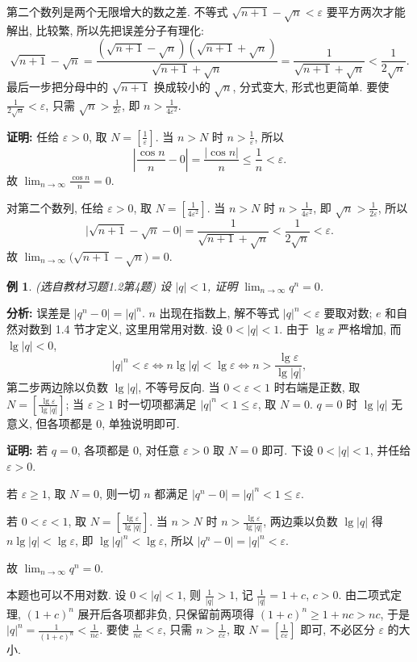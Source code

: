 \documentclass[UTF8,openany]{ctexbook}
\theoremstyle{chinesetextbook}
\newtheorem{example}{例}[section]
\newenvironment{cnproof}{\par\indent\textbf{证明:} \ignorespaces}{\par}
\begin{document}
第二个数列是两个无限增大的数之差. 不等式 $\sqrt{n+1}-\sqrt n<\varepsilon$ 要平方两次才能解出, 比较繁, 所以先把误差分子有理化:
\[
\sqrt{n+1}-\sqrt n=\frac{(\sqrt{n+1}-\sqrt n)(\sqrt{n+1}+\sqrt n)}{\sqrt{n+1}+\sqrt n}=\frac1{\sqrt{n+1}+\sqrt n}<\frac1{2\sqrt n}.
\]
最后一步把分母中的 $\sqrt{n+1}$ 换成较小的 $\sqrt n$, 分式变大, 形式也更简单. 要使 $\displaystyle\frac1{2\sqrt n}<\varepsilon$, 只需 $\displaystyle\sqrt n>\frac1{2\varepsilon}$, 即 $\displaystyle n>\frac1{4\varepsilon^2}$.
\begin{cnproof}
任给 $\varepsilon>0$, 取 $\displaystyle N=\left[\frac1\varepsilon\right]$. 当 $n>N$ 时 $\displaystyle n>\frac1\varepsilon$, 所以
\[
\left|\frac{\cos n}n-0\right|=\frac{|\cos n|}n\le\frac1n<\varepsilon.
\]
故 $\displaystyle\lim_{n\to\infty}\frac{\cos n}n=0$.

对第二个数列, 任给 $\varepsilon>0$, 取 $\displaystyle N=\left[\frac1{4\varepsilon^2}\right]$. 当 $n>N$ 时 $\displaystyle n>\frac1{4\varepsilon^2}$, 即 $\displaystyle\sqrt n>\frac1{2\varepsilon}$, 所以
\[
\bigl|\sqrt{n+1}-\sqrt n-0\bigr|=\frac1{\sqrt{n+1}+\sqrt n}<\frac1{2\sqrt n}<\varepsilon.
\]
故 $\displaystyle\lim_{n\to\infty}\bigl(\sqrt{n+1}-\sqrt n\bigr)=0$.
\end{cnproof}
\begin{example}\label{ex:h12-4}
\textnormal{(选自教材习题1.2第4题)} 设 $|q|<1$, 证明 $\displaystyle\lim_{n\to\infty}q^n=0$.
\end{example}
\par\indent\textbf{分析:} 误差是 $|q^n-0|=|q|^n$. $n$ 出现在指数上, 解不等式 $|q|^n<\varepsilon$ 要取对数; $e$ 和自然对数到 1.4 节才定义, 这里用常用对数. 设 $0<|q|<1$. 由于 $\lg x$ 严格增加, 而 $\lg|q|<0$,
\[
|q|^n<\varepsilon\iff n\lg|q|<\lg\varepsilon\iff n>\frac{\lg\varepsilon}{\lg|q|},
\]
第二步两边除以负数 $\lg|q|$, 不等号反向. 当 $0<\varepsilon<1$ 时右端是正数, 取 $\displaystyle N=\left[\frac{\lg\varepsilon}{\lg|q|}\right]$; 当 $\varepsilon\ge1$ 时一切项都满足 $|q|^n<1\le\varepsilon$, 取 $N=0$. $q=0$ 时 $\lg|q|$ 无意义, 但各项都是 $0$, 单独说明即可.
\begin{cnproof}
若 $q=0$, 各项都是 $0$, 对任意 $\varepsilon>0$ 取 $N=0$ 即可. 下设 $0<|q|<1$, 并任给 $\varepsilon>0$.

若 $\varepsilon\ge1$, 取 $N=0$, 则一切 $n$ 都满足 $|q^n-0|=|q|^n<1\le\varepsilon$.

若 $0<\varepsilon<1$, 取 $\displaystyle N=\left[\frac{\lg\varepsilon}{\lg|q|}\right]$. 当 $n>N$ 时 $\displaystyle n>\frac{\lg\varepsilon}{\lg|q|}$, 两边乘以负数 $\lg|q|$ 得 $n\lg|q|<\lg\varepsilon$, 即 $\lg|q|^n<\lg\varepsilon$, 所以 $|q^n-0|=|q|^n<\varepsilon$.

故 $\displaystyle\lim_{n\to\infty}q^n=0$.
\end{cnproof}
本题也可以不用对数. 设 $0<|q|<1$, 则 $\displaystyle\frac1{|q|}>1$, 记 $\displaystyle\frac1{|q|}=1+c$, $c>0$. 由二项式定理, $(1+c)^n$ 展开后各项都非负, 只保留前两项得 $(1+c)^n\ge1+nc>nc$, 于是 $\displaystyle|q|^n=\frac1{(1+c)^n}<\frac1{nc}$. 要使 $\displaystyle\frac1{nc}<\varepsilon$, 只需 $\displaystyle n>\frac1{c\varepsilon}$, 取 $\displaystyle N=\left[\frac1{c\varepsilon}\right]$ 即可, 不必区分 $\varepsilon$ 的大小.
\end{document}
